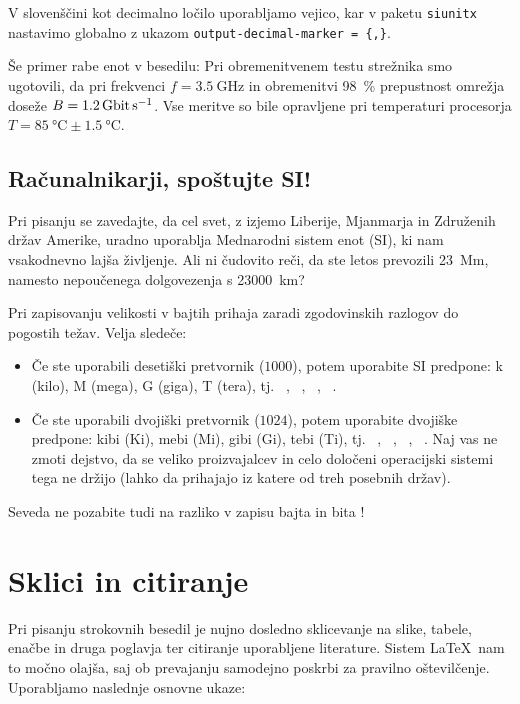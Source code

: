 \documentclass[a4paper,12pt,openright]{book}
\begin{document}
V slovenščini kot decimalno ločilo uporabljamo vejico, kar v paketu \texttt{siunitx} nastavimo globalno z ukazom \texttt{output-decimal-marker = \{,\}}.

Še primer rabe enot v besedilu: Pri obremenitvenem testu strežnika smo ugotovili, da pri frekvenci $f = \qty{3,5}{\giga\hertz}$ in obremenitvi \qty{98}{\percent} prepustnost omrežja doseže $B = \qty{1,2}{\giga\bit\per\second}$. Vse meritve so bile opravljene pri temperaturi procesorja $T = \qty{85}{\degreeCelsius} \pm \qty{1,5}{\degreeCelsius}$.

\subsection{Računalnikarji, spoštujte SI!}
Pri pisanju se zavedajte, da cel svet, z izjemo Liberije, Mjanmarja in Združenih držav Amerike, uradno uporablja Mednarodni sistem enot (SI), ki nam vsakodnevno lajša življenje. Ali ni čudovito reči, da ste letos prevozili \qty{23}{\mega\meter}, namesto nepoučenega dolgovezenja s \qty{23000}{\kilo\meter}?

Pri zapisovanju velikosti v bajtih prihaja zaradi zgodovinskih razlogov do pogostih težav. Velja sledeče:
\begin{itemize}
\item Če ste uporabili desetiški pretvornik ($1000$), potem uporabite SI predpone: k (kilo), M (mega), G (giga), T (tera), tj. \unit{\kilo\byte}, \unit{\mega\byte}, \unit{\giga\byte}, \unit{\tera\byte}.
\item Če ste uporabili dvojiški pretvornik ($1024$), potem uporabite dvojiške predpone: 
kibi (\unit{Ki}), mebi (\unit{Mi}), gibi (\unit{Gi}), tebi (\unit{Ti}), 
tj. \unit{\kibi\byte}, \unit{\mebi\byte}, \unit{\gibi\byte}, \unit{\tebi\byte}. 
Naj vas ne zmoti dejstvo, da se veliko proizvajalcev in celo določeni operacijski 
sistemi tega ne držijo (lahko da prihajajo iz katere od treh posebnih držav).
\end{itemize}

Seveda ne pozabite tudi na razliko v zapisu bajta \unit{\byte} in bita \unit{\bit}!

\section{Sklici in citiranje}

Pri pisanju strokovnih besedil je nujno dosledno sklicevanje na slike, tabele, enačbe in druga poglavja ter citiranje uporabljene literature. Sistem \LaTeX\ nam to močno olajša, saj ob prevajanju samodejno poskrbi za pravilno oštevilčenje. Uporabljamo naslednje osnovne ukaze:
\end{document}
